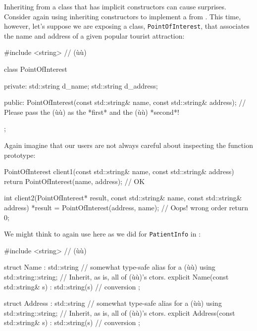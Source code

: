 Inheriting from a class that has implicit constructors can cause
surprises. Consider again using inheriting constructors to
implement a  from .
This time, however, let's suppose we are
exposing a class,
\lstinline!PointOfInterest!, that associates the name and address of a
given popular tourist attraction:

\begin{emcppslisting}[emcppsbatch=e10]
#include <string>  // (ù{}ù)

class PointOfInterest
{
private:
    std::string d_name;
    std::string d_address;

public:
    PointOfInterest(const std::string& name, const std::string& address);
        // Please pass the (ù{}ù) as the *first* and the (ù{}ù) *second*!
};
\end{emcppslisting}

\noindent Again imagine that our users are not always careful about inspecting the
function prototype:

\begin{emcppslisting}[emcppsbatch=e10]
PointOfInterest client1(const std::string& name, const std::string& address)
{
    return PointOfInterest(name, address);  // OK
}

int client2(PointOfInterest*   result,
            const std::string& name,
            const std::string& address)
{
    *result = PointOfInterest(address, name);  // Oops! wrong order
    return 0;
}
\end{emcppslisting}

\noindent We might think to again use  here as we
did for \lstinline!PatientInfo! in :

\begin{emcppshiddenlisting}[emcppsbatch=e11]
#include <string>   // (ù{}ù)
\end{emcppshiddenlisting}
\begin{emcppslisting}[emcppsbatch=e11]
struct Name : std::string  // somewhat type-safe alias for a (ù{}ù)
{
    using std::string::string;  // Inherit, as is, all of (ù{}ù)'s ctors.
    explicit Name(const std::string& s) : std::string(s) { }  // conversion
};

struct Address : std::string  // somewhat type-safe alias for a (ù{}ù)
{
    using std::string::string;  // Inherit, as is, all of (ù{}ù)'s ctors.
    explicit Address(const std::string& s) : std::string(s) { }  // conversion
};
\end{emcppslisting}


